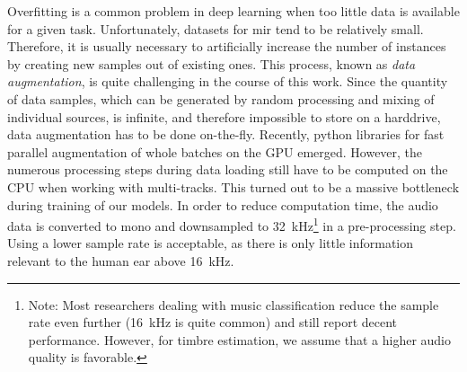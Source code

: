 Overfitting is a common problem in deep learning when too little data is available for a given task. Unfortunately, datasets for \gls{mir} tend to be relatively small. Therefore, it is usually necessary to artificially increase the number of instances by creating new samples out of existing ones. This process, known as \textit{data augmentation}, is quite challenging in the course of this work. Since the quantity of data samples, which can be generated by random processing and mixing of individual sources, is infinite, and therefore impossible to store on a harddrive, data augmentation has to be done on-the-fly. Recently, python libraries for fast parallel augmentation of whole batches on the GPU emerged. However, the numerous processing steps during data loading still have to be computed on the CPU when working with multi-tracks. This turned out to be a massive bottleneck during training of our models. In order to reduce computation time, the audio data is converted to mono and downsampled to \SI{32}{\kilo\hertz}\footnote{Note: Most researchers dealing with music classification reduce the sample rate even further (\SI{16}{\kilo\hertz} is quite common) and still report decent performance. However, for timbre estimation, we assume that a higher audio quality is favorable.} in a pre-processing step. Using a lower sample rate is acceptable, as there is only little information relevant to the human ear above \SI{16}{\kilo\hertz}.\\

